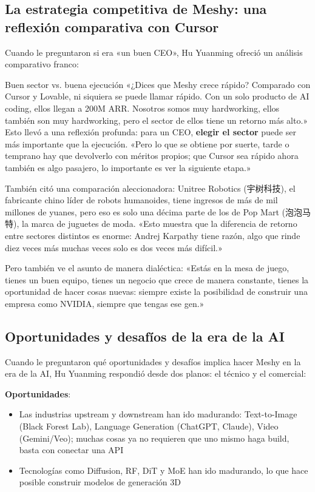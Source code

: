 \documentclass[a4paper]{article}
\begin{document}
\subsection{La estrategia competitiva de Meshy: una reflexión comparativa con Cursor}

Cuando le preguntaron si era «un buen CEO», Hu Yuanming ofreció un análisis comparativo franco:

\begin{knowledgebox}{Buen sector vs. buena ejecución}
«¿Dices que Meshy crece rápido? Comparado con Cursor y Lovable, ni siquiera se puede llamar rápido. Con un solo producto de AI coding, ellos llegan a 200M ARR. Nosotros somos muy hardworking, ellos también son muy hardworking, pero el sector de ellos tiene un retorno más alto.» Esto llevó a una reflexión profunda: para un CEO, \textbf{elegir el sector} puede ser más importante que la ejecución. «Pero lo que se obtiene por suerte, tarde o temprano hay que devolverlo con méritos propios; que Cursor sea rápido ahora también es algo pasajero, lo importante es ver la siguiente etapa.»
\end{knowledgebox}

También citó una comparación aleccionadora: Unitree Robotics (宇树科技), el fabricante chino líder de robots humanoides, tiene ingresos de más de mil millones de yuanes, pero eso es solo una décima parte de los de Pop Mart (泡泡马特), la marca de juguetes de moda. «Esto muestra que la diferencia de retorno entre sectores distintos es enorme: Andrej Karpathy tiene razón, algo que rinde diez veces más muchas veces solo es dos veces más difícil.»

Pero también ve el asunto de manera dialéctica: «Estás en la mesa de juego, tienes un buen equipo, tienes un negocio que crece de manera constante, tienes la oportunidad de hacer cosas nuevas: siempre existe la posibilidad de construir una empresa como NVIDIA, siempre que tengas ese gen.»

\subsection{Oportunidades y desafíos de la era de la AI}

Cuando le preguntaron qué oportunidades y desafíos implica hacer Meshy en la era de la AI, Hu Yuanming respondió desde dos planos: el técnico y el comercial:

\textbf{Oportunidades}:
\begin{itemize}
\item Las industrias upstream y downstream han ido madurando: Text-to-Image (Black Forest Lab), Language Generation (ChatGPT, Claude), Video (Gemini/Veo); muchas cosas ya no requieren que uno mismo haga build, basta con conectar una API
\item Tecnologías como Diffusion, RF, DiT y MoE han ido madurando, lo que hace posible construir modelos de generación 3D
\end{itemize}
\end{document}
